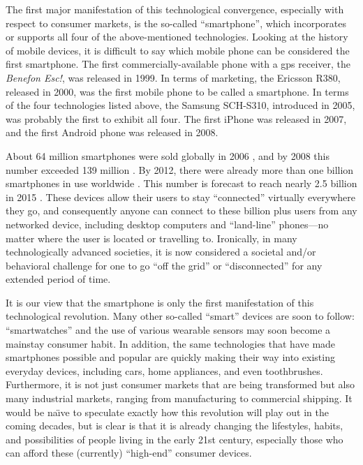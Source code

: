The first major manifestation of this technological convergence, especially with respect to consumer markets, is the so-called ``smartphone'', which incorporates or supports all four of the above-mentioned technologies. Looking at the history of mobile devices, it is difficult to say which mobile phone can be considered the first smartphone. The first commercially-available phone with a \gls{gps} receiver, the \emph{Benefon Esc!}, was released in 1999. In terms of marketing, the Ericsson R380, released in 2000, was the first mobile phone to be called a smartphone. In terms of the four technologies listed above, the Samsung SCH-S310, introduced in 2005, was probably the first to exhibit all four. The first iPhone was released in 2007, and the first Android phone was released in 2008.

About 64 million smartphones were sold globally in 2006 \cite{canalys_2007}, and by 2008 this number exceeded 139 million \cite{Gartner2009}. By 2012, there were already more than one billion smartphones in use worldwide \cite{Mawston2012}. This number is forecast to reach nearly 2.5 billion in 2015 \cite{KoreaTimes2014}. These devices allow their users to stay ``connected'' virtually everywhere they go, and consequently anyone can connect to these billion plus users from any networked device, including desktop computers and ``land-line'' phones---no matter where the user is located or travelling to. Ironically, in many technologically advanced societies, it is now considered a societal and/or behavioral challenge for one to go ``off the grid'' or ``disconnected'' for any extended period of time.

It is our view that the smartphone is only the first manifestation of this technological revolution. Many other so-called ``smart'' devices are soon to follow: ``smartwatches'' and the use  of various wearable sensors may soon become a mainstay consumer habit. In addition, the same technologies that have made smartphones possible and popular are quickly making their way into existing everyday devices, including cars, home appliances, and even toothbrushes. Furthermore, it is not just consumer markets that are being transformed but also many industrial markets, ranging from manufacturing to commercial shipping. It would be  na\"{\i}ve to speculate exactly how this revolution will play out in the coming decades, but is clear is that it is already changing the lifestyles, habits, and possibilities of people living in the early 21st century, especially those who can afford these (currently) ``high-end'' consumer devices.

